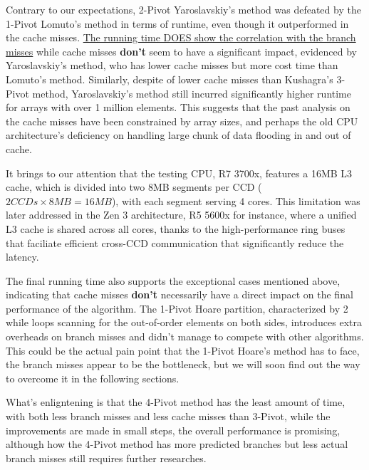 \documentclass[a4paper,oneside,12pt]{book}
\newcommand{\bigO}{\mathcal{O}}
\begin{document}

Contrary to our expectations, 2-Pivot Yaroslavskiy's method was defeated by the 1-Pivot Lomuto's method in terms of runtime, even though it outperformed in the cache misses.
\hypertarget{BranchMissMatterMoreThanCache}{}\underline{The running time DOES show the correlation with the branch misses} while cache misses \textbf{don't} seem to have a significant impact, evidenced by Yaroslavskiy's method, who has lower cache misses but more cost time than Lomuto's method.
Similarly, despite of lower cache misses than Kushagra's 3-Pivot method, Yaroslavskiy's method still incurred significantly higher runtime for arrays with over 1 million elements.
This suggests that the past analysis on the cache misses have been constrained by array sizes, and perhaps the old CPU architecture's deficiency on handling large chunk of data flooding in and out of cache.

It brings to our attention that the testing CPU, R7 3700x, features a 16MB L3 cache, which is divided into two 8MB segments per CCD ($2 CCDs \times 8MB = 16MB$), with each segment serving 4 cores.
This limitation was later addressed in the Zen 3 architecture, R5 5600x for instance, where a unified L3 cache is shared across all cores, thanks to the high-performance ring buses that faciliate efficient cross-CCD communication that significantly reduce the latency.

The final running time also supports the exceptional cases mentioned above, indicating that cache misses \textbf{don't} necessarily have a direct impact on the final performance of the algorithm.
The 1-Pivot Hoare partition, characterized by 2 while loops scanning for the out-of-order elements on both sides, introduces extra overheads on branch misses and didn't manage to compete with other algorithms.
This could be the actual pain point that the 1-Pivot Hoare's method has to face, the branch misses appear to be the bottleneck, but we will soon find out the way to overcome it in the following sections.

What's enligntening is that the 4-Pivot method has the least amount of time, with both less branch misses and less cache misses than 3-Pivot, while the improvements are made in small steps, the overall performance is promising,
although how the 4-Pivot method has more predicted branches but less actual branch misses still requires further researches.
\end{document}
